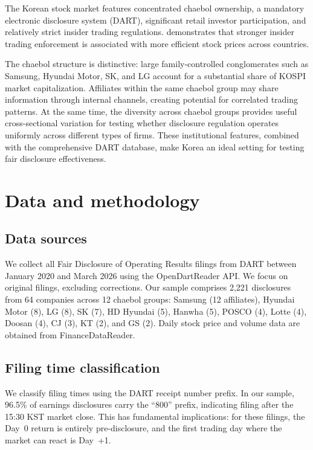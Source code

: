 \documentclass[review,authoryear]{elsarticle}
\begin{document}
The Korean stock market features concentrated chaebol ownership, a mandatory electronic disclosure system (DART), significant retail investor participation, and relatively strict insider trading regulations. \citet{beny2005impact} demonstrates that stronger insider trading enforcement is associated with more efficient stock prices across countries.

The chaebol structure is distinctive: large family-controlled conglomerates such as Samsung, Hyundai Motor, SK, and LG account for a substantial share of KOSPI market capitalization. Affiliates within the same chaebol group may share information through internal channels, creating potential for correlated trading patterns. At the same time, the diversity across chaebol groups provides useful cross-sectional variation for testing whether disclosure regulation operates uniformly across different types of firms. These institutional features, combined with the comprehensive DART database, make Korea an ideal setting for testing fair disclosure effectiveness.

\section{Data and methodology}
\label{sec:data}

\subsection{Data sources}

We collect all Fair Disclosure of Operating Results filings from DART between January 2020 and March 2026 using the OpenDartReader API. We focus on original filings, excluding corrections. Our sample comprises 2,221 disclosures from 64 companies across 12 chaebol groups: Samsung (12 affiliates), Hyundai Motor (8), LG (8), SK (7), HD Hyundai (5), Hanwha (5), POSCO (4), Lotte (4), Doosan (4), CJ (3), KT (2), and GS (2). Daily stock price and volume data are obtained from FinanceDataReader.

\subsection{Filing time classification}

We classify filing times using the DART receipt number prefix. In our sample, 96.5\% of earnings disclosures carry the ``800'' prefix, indicating filing after the 15:30 KST market close. This has fundamental implications: for these filings, the Day~0 return is entirely pre-disclosure, and the first trading day where the market can react is Day~+1.
\end{document}
